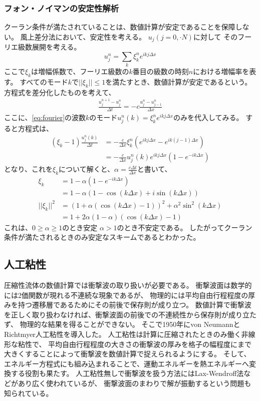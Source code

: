 \documentclass{jsarticle}
\begin{document}
\subsubsection{フォン・ノイマンの安定性解析}
クーラン条件が満たされていることは、数値計算が安定であることを保障しない。
風上差分法において、安定性を考える。
$u_j(j=0,\cdot N)$に対して
そのフーリエ級数展開を考える。
\begin{equation}
    u^n_j = \sum_k \xi^n_k e^{ikj\Delta x}\label{eq:fourier}
\end{equation}
ここで$\xi_k$は増幅係数で、フーリエ級数の$k$番目の級数の時刻$n$における増幅率を表す。
すべてのモード$k$で$||\xi_k||\leq1$を満たすとき、数値計算が安定であるという。
方程式を差分化したものを考えて、
\begin{align}
    \frac{u^{n+1}_j - u^{n}_j}{\Delta t} =- c \frac{u^n_{j} - u^n_{j-1}}{\Delta x}
\end{align}
ここに、\eqref{eq:fourier}の波数$k$のモード$u^n_j(k) = \xi^n_ke^{ikj\Delta x}$のみを代入してみる。
すると方程式は、
\begin{align}
    (\xi_k -1)\frac{u^n_j(k)}{\Delta t}&=- \frac{c}{\Delta x} \xi^n_k(e^{ikj\Delta x} - e^{ik(j-1)\Delta x})\\
                                        &=- \frac{c}{\Delta x} u^n_j(k)e^{ikj\Delta x}(1 - e^{-ik\Delta x})
\end{align}
となり、これを$\xi_k$について解くと、$\alpha = \frac{c\Delta t}{\Delta x}$と書いて、
\begin{align}
    \xi_k &= 1 -  \alpha(1 - e^{-ik\Delta x})\\
          &= 1 - \alpha (1 - \cos(k\Delta x) + i\sin(k\Delta x))\\
    ||\xi_k||^2 &= (1 + \alpha(\cos(k\Delta x) -1))^2 + \alpha^2 \sin^2(k\Delta x)\\
                &= 1 + 2\alpha(1-\alpha)(\cos(k\Delta x) -1)
\end{align}
これは、$0 \geq \alpha \geq 1$のとき安定
$\alpha > 1$のとき不安定である。
したがってクーラン条件が満たされるときのみ安定なスキームであるとわかった。
\subsection{人工粘性}
圧縮性流体の数値計算では衝撃波の取り扱いが必要である。
衝撃波面は数学的には2価関数が現れる不連続な現象であるが、
物理的には平均自由行程程度の厚みを持つ遷移層であるためにその前後で保存則が成り立つ。
数値計算で衝撃波を正しく取り扱わなければ、衝撃波面の前後での不連続性から保存則が成り立たず、
物理的な結果を得ることができない。
そこで1950年にvon NeumannとRichtmyer人工粘性を導入した。
人工粘性は計算に圧縮されたときのみ働く非線形な粘性で、
平均自由行程程度の大きさの衝撃波の厚みを格子の幅程度にまで大きくすることによって衝撃波を数値計算で捉えられるようにする。
そして、エネルギー方程式にも組み込まれることで、運動エネルギーを熱エネルギーへ変換する役割も果たす。
人工粘性無しで衝撃波を扱う方法にはLax-Wendroff法などがあり広く使われているが、
衝撃波面のまわりで解が振動するという問題も知られている。
\end{document}
